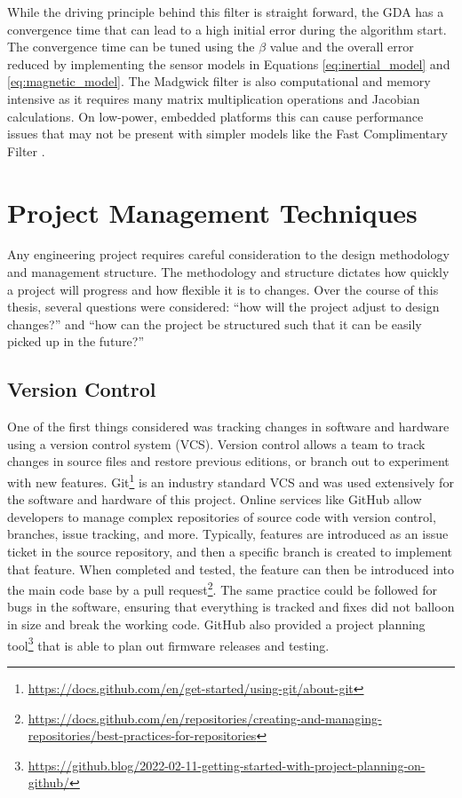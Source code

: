 While the driving principle behind this filter is straight forward, the GDA has a convergence time that can lead to a high initial error during the algorithm start.
The convergence time can be tuned using the $\beta$ value and the overall error reduced by implementing the sensor models in Equations \ref{eq:inertial_model} and \ref{eq:magnetic_model}.
The Madgwick filter is also computational and memory intensive as it requires many matrix multiplication operations and Jacobian calculations.
On low-power, embedded platforms this can cause performance issues that may not be present with simpler models like the Fast Complimentary Filter \cite{FCF:2016}.

\section{Project Management Techniques} 
Any engineering project requires careful consideration to the design methodology and management structure.
The methodology and structure dictates how quickly a project will progress and how flexible it is to changes.
Over the course of this thesis, several questions were considered: ``how will the project adjust to design changes?'' and ``how can the project be structured such that it can be easily picked up in the future?''

\subsection{Version Control} 
One of the first things considered was tracking changes in software and hardware using a version control system (VCS).
Version control allows a team to track changes in source files and restore previous editions, or branch out to experiment with new features.
Git\footnote{\url{https://docs.github.com/en/get-started/using-git/about-git}} is an industry standard VCS and was used extensively for the software and hardware of this project.
Online services like GitHub allow developers to manage complex repositories of source code with version control, branches, issue tracking, and more.
Typically, features are introduced as an issue ticket in the source repository, and then a specific branch is created to implement that feature.
When completed and tested, the feature can then be introduced into the main code base by a pull request\footnote
{\url{https://docs.github.com/en/repositories/creating-and-managing-repositories/best-practices-for-repositories}}.
The same practice could be followed for bugs in the software, ensuring that everything is tracked and fixes did not balloon in size and break the working code.
GitHub also provided a project planning tool\footnote{\url{https://github.blog/2022-02-11-getting-started-with-project-planning-on-github/}} that is able to plan out firmware releases and testing.

